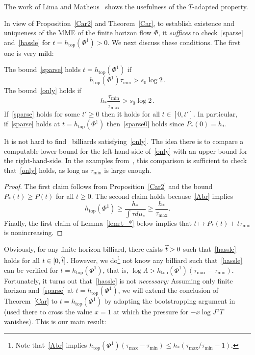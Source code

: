 \documentclass[AHL,Unicode,longabstracts,published]{cedram}
\newcommand{\htop}{h_{\scriptstyle{\text{top}}}}
\let\oldtilde\tilde
\renewcommand*{\tilde}[1]{\mathchoice{\widetilde{#1}}{\widetilde{#1}}{\oldtilde{#1}}{\oldtilde{#1}}}
\newcommand{\htop}{h_{\scriptstyle{\text{top}}}}
\begin{document}
The work of Lima and Matheus~\cite{LM} shows the usefulness of the $T$-adapted property.




In view of Proposition~\ref{Car2} and Theorem~\ref{Car}, to establish existence and uniqueness of the MME of the finite horizon flow $\Phi$, it \emph{suffices} to check~\eqref{sparse} and~\eqref{hassle} for $t=\htop(\Phi^1)>0$. We next discuss these conditions. The first one is very mild:

\begin{lemm}\label{mild}
The bound~\eqref{sparse} holds $t=\htop(\Phi^1)$ if
\begin{equation}\label{only}
\htop\left(\Phi^1\right) \tau_{\min}> s_0 \log 2 \,.
\end{equation}
The bound~\eqref{only} holds if
\begin{equation}\label{only'}
h_* \frac{\tau_{\min}}{\tau_{\max}} > s_0 \log 2\,.
\end{equation}
If~\eqref{sparse} holds for some $t'\ge 0$ then it holds for all $t\in [0,t']$. In particular, if~\eqref{sparse} holds at $t=\htop(\Phi^1)$ then~\eqref{sparse0} holds since $P_*(0)=h_*$.
\end{lemm}

It is not hard to find~\cite[Remark~5.6]{Ca} billiards satisfying~\eqref{only}. The idea there is to compare a computable lower bound for the left-hand-side of~\eqref{only} with an upper bound for the right-hand-side. In the examples from~\cite[\S~2.4]{BD1}, this comparison is sufficient to check that~\eqref{only} holds, as long as $\tau_{\min}$ is large enough.

\begin{proof}
The first claim follows from Proposition~\ref{Car2} and the bound $P_*(t)\ge P(t)$ for all $t\ge 0$. The second claim holds because~\eqref{Abr} implies
\[
\htop\left(\Phi^1\right)\ge \frac{h_*}{\int \tau d\mu_*} \ge \frac{h_*}{\tau_{\max}}.
\]
Finally, the first claim of Lemma~\ref{lem:t_*} below implies that $t\mapsto P_*(t)+t\tau_{\min}$ is nonincreasing.
\end{proof}



Obviously, for any finite horizon billiard, there exists $\tilde t>0$ such that~\eqref{hassle} holds for all $t\in[0, \tilde t]$. However, we do\footnote{Note that~\eqref{Abr} implies $\htop(\Phi^1) (\tau_{\max}-\tau_{\min}) \le h_* (\tau_{\max}/\tau_{\min}-1)$.} not know any billiard such that~\eqref{hassle} can be verified for $t=\htop(\Phi^1)$, that is, $
\log \Lambda > \htop(\Phi^1) (\tau_{\max}-\tau_{\min})$. Fortunately, it turns out that~\eqref{hassle} is not \emph{necessary:} Assuming only finite horizon and~\eqref{sparse} at $t=\htop(\Phi^1)$, we will extend the conclusion of Theorem~\ref{Car} to $t=\htop(\Phi^1)$ by adapting the bootstrapping argument in~\cite[Lemma~3.10]{BD2} (used there to cross the value $x=1$ at which the pressure for $-x\log J^u T$ vanishes). This is our main result:
\end{document}
